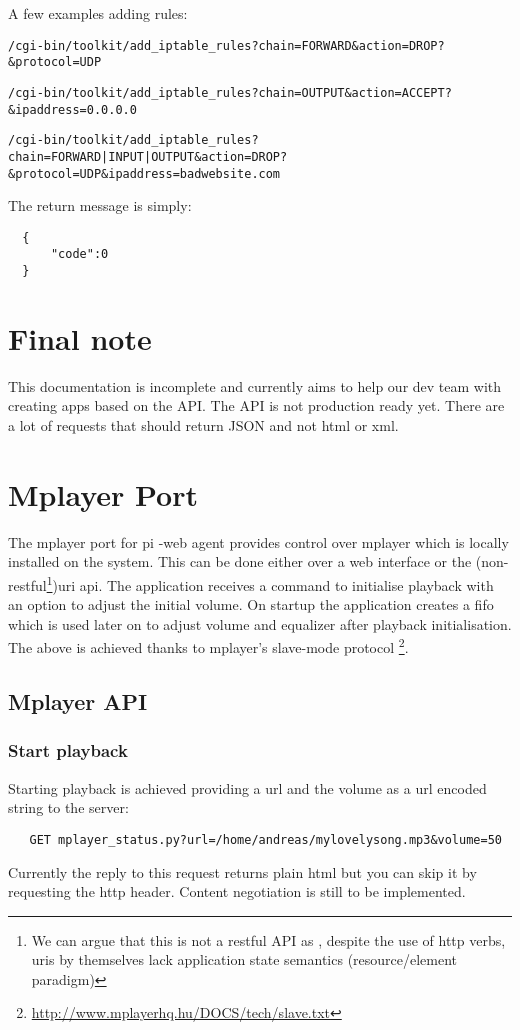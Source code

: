 \documentclass[12pt]{article}
\begin{document}
  
  A few examples adding rules:
  
  
  \texttt{/cgi-bin/toolkit/add\_iptable\_rules?chain=FORWARD\&action=DROP?\&protocol=UDP}
  
  
  \texttt{/cgi-bin/toolkit/add\_iptable\_rules?chain=OUTPUT\&action=ACCEPT?\&ipaddress=0.0.0.0}
  
  
  \texttt{/cgi-bin/toolkit/add\_iptable\_rules?chain=FORWARD|INPUT|OUTPUT\&action=DROP?\&protocol=UDP\&ipaddress=badwebsite.com}
  
  
  The return message is simply:
  
  \begin{verbatim}
  {
      "code":0
  }
  \end{verbatim}
  
  
 \section{Final note}
 This documentation is incomplete and currently aims to help our dev team with creating apps based on the API. The API is not production ready yet. There are a lot of requests that should return JSON and not html or xml.
  
 \section{Mplayer Port}
  The mplayer port for pi -web agent provides control over mplayer which is locally installed on the system.  This can be done  either over a web interface or the (non-restful\footnote{We can argue that this is not a restful API as , despite the use of http verbs, uris by themselves lack application state semantics (resource/element paradigm) })uri api. The application receives a command to initialise playback with an option to adjust the initial volume. On startup the application creates a fifo which is used later on to  adjust volume and equalizer after playback initialisation. The above is achieved thanks to mplayer’s slave-mode protocol \footnote{\href{http://www.mplayerhq.hu/DOCS/tech/slave.txt}{http://www.mplayerhq.hu/DOCS/tech/slave.txt}}. 


 \subsection{Mplayer API}


  \subsubsection{Start playback}
   Starting playback is achieved providing  a url and the volume as a url encoded string to the server:
   \begin{verbatim}
   GET mplayer_status.py?url=/home/andreas/mylovelysong.mp3&volume=50
   \end{verbatim}
   Currently the reply to this  request returns plain html but you can skip it by requesting the http header. Content negotiation is still to be implemented. 
\end{document}
